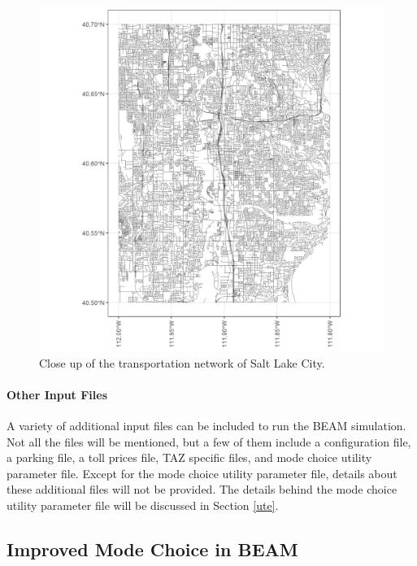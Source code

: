 \documentclass[3p, authoryear, review]{elsarticle} %
\begin{document}
\begin{figure}

{\centering \includegraphics[width=29.17in]{pics/smallnetwork} 

}

\caption{Close up of the transportation network of Salt Lake City.}\label{fig:closent}
\end{figure}

\hypertarget{other-input-files}{%
\paragraph{Other Input Files}\label{other-input-files}}

A variety of additional input files can be included to run the BEAM simulation. Not all the files will be mentioned, but a few of them include a configuration file, a parking file, a toll prices file, TAZ specific files, and mode choice utility parameter file. Except for the mode choice utility parameter file, details about these additional files will not be provided. The details behind the mode choice utility parameter file will be discussed in Section \ref{ute}.

\hypertarget{mbeam}{%
\subsection{Improved Mode Choice in BEAM}\label{mbeam}}
\end{document}
